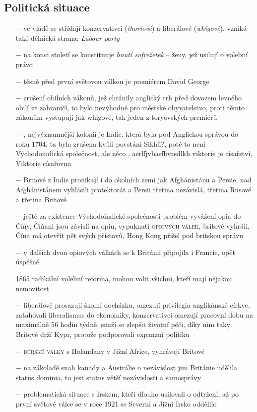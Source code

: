 \documentclass{article}
\begin{document}
\subsection*{Politická situace}
\begin{itemize}
    \vspace{-0.5em}
    \setlength\itemsep{0.15em}
    \item[$-$] ve vládě se střídají konzervativci (\textit{thoriové}) a liberálové (\textit{whigové}), vzniká také dělnická strana: \textit{Labour party}
    \item[$-$] na konci století se konstituuje \textit{hnutí sufrežetek} -- ženy, jež usilují o volební právo
    \item[$-$] těsně před první světovou válkou je premiérem    David George
    \item[$-$] zrušení obilních zákonů, jež chránily anglický trh před dovozem levného obilí ze zahraničí, to bylo nevýhodné pro městské obyvatelstvo, proti těmto zákonům vystupují jak whigové, tak jeden z toryovských premiérů
    \item[$-$] , nejvýznamnější kolonií je Indie, která byla pod Anglickou správou do roku 1704, ta byla zrušena kvůli povstání Sikhů?, poté to není Východoindická společnost, ale  něco , aerlfjvbasfbvasdlkh viktorie je císařství, Viktorie císařovna
    \item[$-$] Britové z Indie pronikají i do okolních zemí jak Afghánistánu a Persie, nad Afghánistánem vyhlásili protektorát a Persii třetina nezávislá, třetina Rusové a třetina Britové
    \item[$-$] ještě za existence Východoindické společnosti problém vyvážení opia do Číny, Číňani jsou závislí na opiu, vypuknutí \textsc{opiových válek}, britové vyhráli, Čína má otevřít pět svých přístavů, Hong Kong přišel pod britskou správu
    \item[$-$] v dalších dvou opiových válkách se k Británii připojila i Francie, opět úspěšné
    \item[1865] radikální volební reforma, mohou volit všichni, kteří mají nějakou nemovitost
    \item[$-$] liberálové prosazují školní docházku, omezují privilegia anglikánské církve, zatahovali liberalismus do ekonomiky, konzervativci omezují pracovní dobu na maximálně 56 hodin týdně, snaží se zlepšit životní péči, díky nim taky Britové drží Kypr, protože podporovali expanzní politiku
    \item[$-$] \textsc{búrské války} s Holanďany v Jižní Africe, vyhrávají Britové
    \item[$-$] na zákoladě snah kanady a Austrálie o nezávislost jim Británie udělila status dominia, to jest status větší nezávislosti a samosprávy
    \item[$-$] problematická situace s Irskem, kteří dlouho usilovali o odtržení, až po první světové válce se v roce 1921 se Severní a Jižní Irsko oddělilo
\end{itemize}
\end{document}
